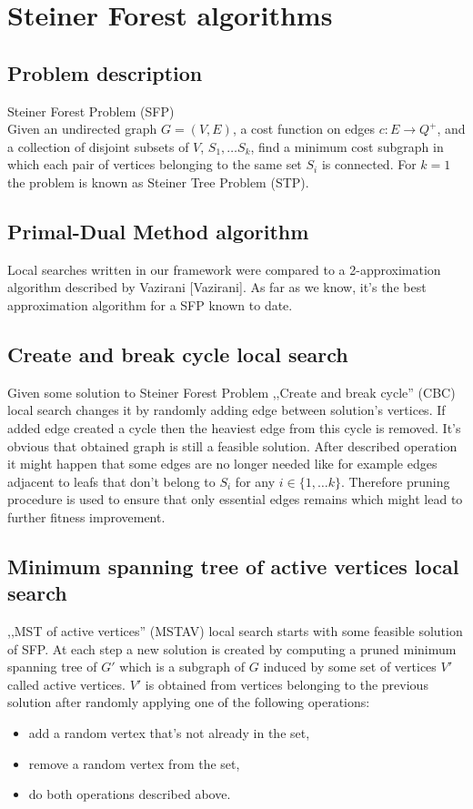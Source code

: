 \chapter{Steiner Forest algorithms}

\section{Problem description}
Steiner Forest Problem (SFP)\\
Given an undirected graph $G = (V, E)$, a cost function on edges $c : E \rightarrow Q^+$, and a collection of disjoint subsets of $V$, $S_1, \dots S_k$, find a minimum cost subgraph in which each pair of vertices belonging to the same set $S_i$ is connected.
For $k = 1$ the problem is known as Steiner Tree Problem (STP).

\section{Primal-Dual Method algorithm}
Local searches written in our framework were compared to a 2-approximation algorithm described by Vazirani [Vazirani]. As far as we know, it's the best approximation algorithm for a SFP known to date.

\section{Create and break cycle local search}
Given some solution to Steiner Forest Problem ,,Create and break cycle'' (CBC) local search changes it by randomly adding edge between solution's vertices. If added edge created a cycle then the heaviest edge from this cycle is removed. It's obvious that obtained graph is still a feasible solution. After described operation it might happen that some edges are no longer needed like for example edges adjacent to leafs that don't belong to $S_i$ for any $i \in \{1, \dots k\}$. Therefore pruning procedure is used to ensure that only essential edges remains which might lead to further fitness improvement.

\section{Minimum spanning tree of active vertices local search}
,,MST of active vertices'' (MSTAV) local search starts with some feasible solution of SFP. At each step a new solution is created by computing a pruned minimum spanning tree of $G'$ which is a subgraph of $G$ induced by some set of vertices $V'$ called active vertices. $V'$ is obtained from vertices belonging to the previous solution after randomly applying one of the following operations:
\begin{itemize}
\item add a random vertex that's not already in the set,
\item remove a random vertex from the set,
\item do both operations described above.
\end{itemize}

